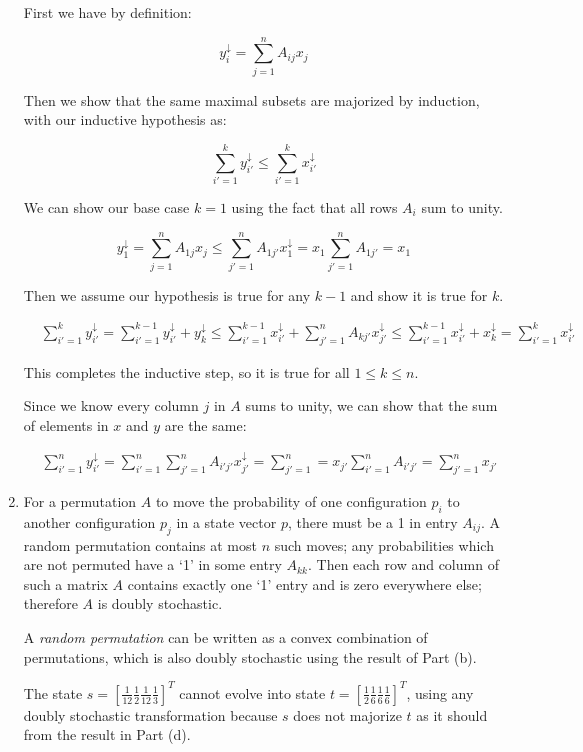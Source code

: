 \documentclass[12pt]{article}
\begin{document}
\begin{enumerate}
First we have by definition:

\begin{displaymath}
y_i^\downarrow = \sum_{j=1}^n A_{ij}x_j
\end{displaymath}

Then we show that the same maximal subsets are majorized by induction,
with our inductive hypothesis as:

\begin{displaymath}
\sum_{i'=1}^k y_{i'}^\downarrow \le \sum_{i'=1}^k x_{i'}^\downarrow
\end{displaymath}

We can show our base case $k=1$ using the fact that all rows $A_i$ sum to unity.

\begin{displaymath}
y_1^\downarrow = \sum_{j=1}^n A_{1j} x_j \le \sum_{j'=1}^n A_{1j'} x_{1}^\downarrow = x_1 \sum_{j'=1}^n A_{1j'} = x_1
\end{displaymath}

Then we assume our hypothesis is true for any $k-1$ and show it is true for
$k$.

\begin{eqnarray*}
& \displaystyle \sum_{i'=1}^k y_{i'}^\downarrow = \sum_{i'=1}^{k-1} y_{i'}^\downarrow + y_k^\downarrow \le \sum_{i'=1}^{k-1} x_{i'}^\downarrow + \sum_{j'=1}^n A_{kj'}x_{j'}^\downarrow \le \sum_{i'=1}^{k-1} x_{i'}^\downarrow + x_k^\downarrow = \sum_{i'=1}^k x_{i'}^\downarrow
\end{eqnarray*}

This completes the inductive step, so it is true for all $1 \le k \le n$.

Since we know every column $j$ in $A$ sums to unity, we can show that
the sum of elements in $x$ and $y$ are the same:

\begin{eqnarray*}
& \sum_{i'=1}^n y_{i'}^\downarrow = \sum_{i'=1}^n \sum_{j'=1}^n A_{i'j'} x_{j'}^\downarrow = \sum_{j'=1}^n = x_{j'} \sum_{i'=1}^n A_{i'j'} = \sum_{j'=1}^n x_{j'}
\end{eqnarray*}

\item
For a permutation $A$ to move the probability of one configuration
$p_i$ to another configuration $p_j$ in a state vector $p$,
there must be a 1 in entry $A_{ij}$. A random permutation contains at most
$n$ such moves; any probabilities which are not permuted have a `1'
in some entry $A_{kk}$.
Then each row and column of such a matrix $A$ contains
exactly one `1' entry and is zero everywhere else; therefore $A$ is
doubly stochastic.

A \textit{random permutation} can be written as a convex combination of 
permutations, which is also doubly stochastic using the result of Part (b).

The state
$s = \left[\frac{1}{12} \frac{1}{2} \frac{1}{12} \frac{1}{3}\right]^T$
cannot evolve into state
$t = \left[\frac{1}{2} \frac{1}{6} \frac{1}{6} \frac{1}{6}\right]^T$,
using any doubly stochastic transformation because $s$ does not majorize
$t$ as it should from the result in Part (d).

\end{enumerate}
\end{document}
